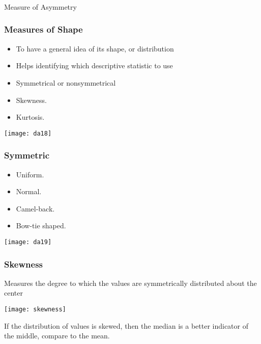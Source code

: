 \begin{frame}[fragile]\frametitle{}
\begin{center}
{\Large Measure of Asymmetry}
\end{center}
\end{frame}

\begin{frame}[fragile]\frametitle{Measures of Shape}	
\begin{itemize}
\item  To have a general idea of its shape, or distribution
\item Helps identifying which descriptive statistic to use
\item  Symmetrical or nonsymmetrical
\item Skewness.
\item Kurtosis.
\end{itemize}
\begin{center}
\texttt{[image: da18]}
\end{center}
\end{frame}

\begin{frame}[fragile]\frametitle{Symmetric}	
\begin{itemize}

\item  Uniform.
\item  Normal.
\item  Camel-back.
\item  Bow-tie shaped.
\end{itemize}
\begin{center}
\texttt{[image: da19]}
\end{center}
\end{frame}

\begin{frame}[fragile]\frametitle{Skewness}	
Measures the degree to which the values are symmetrically distributed about the center
\begin{center}
\texttt{[image: skewness]}
\end{center}
If the distribution of values is skewed, then the median is a better indicator of the middle, compare to the mean.
\end{frame}

